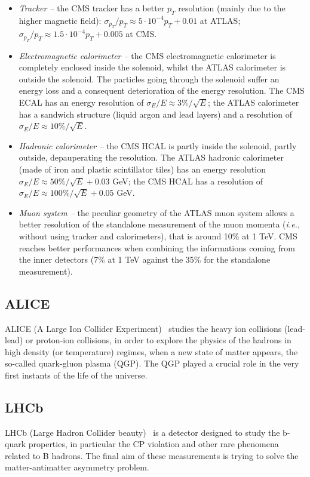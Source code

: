 \begin{itemize}
\item {\itshape Tracker --} the CMS tracker has a better $p_T$ resolution (mainly due to the higher magnetic field): $\sigma_{p_T}/p_T \approx 5 \cdot 10^{-4} p_T + 0.01$ at ATLAS; $\sigma_{p_T}/p_T \approx 1.5 \cdot 10^{-4} p_T + 0.005$ at CMS.
\item {\itshape Electromagnetic calorimeter --} the CMS electromagnetic calorimeter is completely enclosed inside the solenoid, whilst the ATLAS calorimeter is outside the solenoid. The particles going through the solenoid suffer an energy loss and a consequent deterioration of the energy resolution. The CMS ECAL has an energy resolution of $\sigma_E /E \approx 3\%/\sqrt{E}$; the ATLAS calorimeter has a sandwich structure (liquid argon and lead layers) and a resolution of $\sigma_E / E \approx 10\%/\sqrt{E}$.
\item {\itshape Hadronic calorimeter --} the CMS HCAL is partly inside the solenoid, partly outside, depauperating the resolution. The ATLAS hadronic calorimeter (made of iron and plastic scintillator tiles) has an energy resolution $\sigma_E /E \approx 50\%/\sqrt{E} + 0.03$ GeV; the CMS HCAL has a resolution of $\sigma_E /E \approx 100\%/\sqrt{E} + 0.05$ GeV.
\item {\itshape Muon system --} the peculiar geometry of the ATLAS muon system allows a better resolution of the standalone measurement of the muon momenta (\textit{i.e.}, without using tracker and calorimeters), that is around 10\% at 1 TeV. CMS reaches better performances when combining the informations coming from the inner detectors (7\% at 1 TeV against the 35\% for the standalone measurement).
\end{itemize}

\subsection{ALICE}
ALICE (A Large Ion Collider Experiment)~\cite{Aamodt:2008zz} studies the heavy ion collisions (lead-lead) or proton-ion collisions, in order to explore the physics of the hadrons in high density (or temperature) regimes, when a new state of matter appears, the so-called quark-gluon plasma (QGP). The QGP played a crucial role in the very first instants of the life of the universe.

\subsection{LHCb}
LHCb (Large Hadron Collider beauty)~\cite{Alves:2008zz} is a detector designed to study the b-quark properties, in particular the CP violation and other rare phenomena related to B hadrons. The final aim of these measurements is trying to solve the matter-antimatter asymmetry problem.

